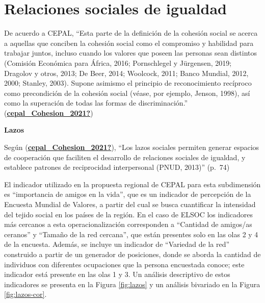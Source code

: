 \documentclass[
  12pt,
]{book}
\begin{document}
\hypertarget{relaciones-sociales-de-igualdad}{%
\section{Relaciones sociales de igualdad}\label{relaciones-sociales-de-igualdad}}

De acuerdo a CEPAL, ``Esta parte de la definición de la cohesión social se acerca a aquellas que conciben la cohesión social como el compromiso y habilidad para trabajar juntos, incluso cuando los valores que poseen las personas sean distintos (Comisión Económica para África, 2016; Pornschlegel y Jürgensen, 2019; Dragolov y otros, 2013; De Beer, 2014; Woolcock, 2011; Banco Mundial, 2012, 2000; Stanley, 2003). Supone asimismo el principio de reconocimiento recíproco como precondición de la cohesión social (véase, por ejemplo, Jenson, 1998), así como la superación de todas las formas de discriminación.'' (\protect\hyperlink{ref-cepal_Cohesion_2021}{\textbf{cepal\_Cohesion\_2021?}})

\textbf{Lazos}

Según (\protect\hyperlink{ref-cepal_Cohesion_2021}{\textbf{cepal\_Cohesion\_2021?}}), ``Los lazos sociales permiten generar espacios de cooperación que faciliten el desarrollo de relaciones sociales de igualdad, y establece patrones de reciprocidad interpersonal (PNUD, 2013)'' (p.~74)

El indicador utilizado en la propuesta regional de CEPAL para esta subdimensión es ``importancia de amigos en la vida'', que es un indicador de percepción de la Encuesta Mundial de Valores, a partir del cual se busca cuantificar la intensidad del tejido social en los países de la región. En el caso de ELSOC los indicadores más cercanos a esta operacionalización corresponden a ``Cantidad de amigos/as ceranos'' y ``Tamaño de la red cercana'', que están presentes solo en las olas 2 y 4 de la encuesta. Además, se incluye un indicador de ``Variedad de la red'' construido a partir de un generador de posiciones, donde se aborda la cantidad de individuos con diferentes ocupaciones que la persona encuestada conoce; este indicador está presente en las olas 1 y 3. Un análisis descriptivo de estos indicadores se presenta en la Figura \ref{fig:lazos} y un análisis bivariado en la Figura \ref{fig:lazos-cor}.
\end{document}
